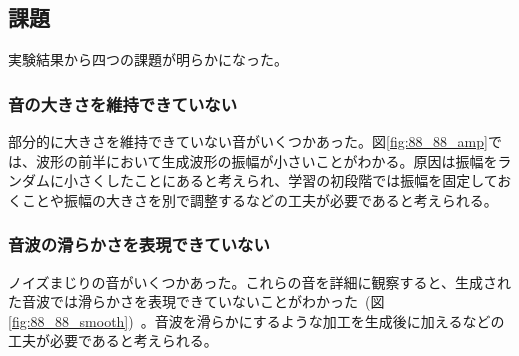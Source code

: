 \subsection{課題}

実験結果から四つの課題が明らかになった。

\subsubsection{音の大きさを維持できていない}

部分的に大きさを維持できていない音がいくつかあった。図\ref{fig:88_88_amp}では、波形の前半において生成波形の振幅が小さいことがわかる。原因は振幅をランダムに小さくしたことにあると考えられ、学習の初段階では振幅を固定しておくことや振幅の大きさを別で調整するなどの工夫が必要であると考えられる。
    
\subsubsection{音波の滑らかさを表現できていない}

ノイズまじりの音がいくつかあった。これらの音を詳細に観察すると、生成された音波では滑らかさを表現できていないことがわかった~(図\ref{fig:88_88_smooth})~。音波を滑らかにするような加工を生成後に加えるなどの工夫が必要であると考えられる。

